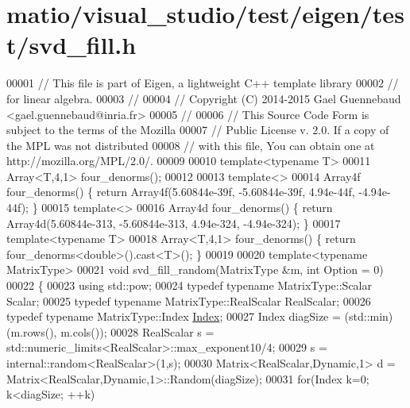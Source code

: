 \hypertarget{matio_2visual__studio_2test_2eigen_2test_2svd__fill_8h_source}{}\section{matio/visual\+\_\+studio/test/eigen/test/svd\+\_\+fill.h}
\label{matio_2visual__studio_2test_2eigen_2test_2svd__fill_8h_source}

\begin{DoxyCode}
00001 \textcolor{comment}{// This file is part of Eigen, a lightweight C++ template library}
00002 \textcolor{comment}{// for linear algebra.}
00003 \textcolor{comment}{//}
00004 \textcolor{comment}{// Copyright (C) 2014-2015 Gael Guennebaud <gael.guennebaud@inria.fr>}
00005 \textcolor{comment}{//}
00006 \textcolor{comment}{// This Source Code Form is subject to the terms of the Mozilla}
00007 \textcolor{comment}{// Public License v. 2.0. If a copy of the MPL was not distributed}
00008 \textcolor{comment}{// with this file, You can obtain one at http://mozilla.org/MPL/2.0/.}
00009 
00010 \textcolor{keyword}{template}<\textcolor{keyword}{typename} T>
00011 Array<T,4,1> four\_denorms();
00012 
00013 \textcolor{keyword}{template}<>
00014 Array4f four\_denorms() \{ \textcolor{keywordflow}{return} Array4f(5.60844e-39f, -5.60844e-39f, 4.94e-44f, -4.94e-44f); \}
00015 \textcolor{keyword}{template}<>
00016 Array4d four\_denorms() \{ \textcolor{keywordflow}{return} Array4d(5.60844e-313, -5.60844e-313, 4.94e-324, -4.94e-324); \}
00017 \textcolor{keyword}{template}<\textcolor{keyword}{typename} T>
00018 Array<T,4,1> four\_denorms() \{ \textcolor{keywordflow}{return} four\_denorms<double>().cast<T>(); \}
00019 
00020 \textcolor{keyword}{template}<\textcolor{keyword}{typename} MatrixType>
00021 \textcolor{keywordtype}{void} svd\_fill\_random(MatrixType &m, \textcolor{keywordtype}{int} Option = 0)
00022 \{
00023   \textcolor{keyword}{using} std::pow;
00024   \textcolor{keyword}{typedef} \textcolor{keyword}{typename} MatrixType::Scalar Scalar;
00025   \textcolor{keyword}{typedef} \textcolor{keyword}{typename} MatrixType::RealScalar RealScalar;
00026   \textcolor{keyword}{typedef} \textcolor{keyword}{typename} MatrixType::Index \hyperlink{namespace_eigen_a62e77e0933482dafde8fe197d9a2cfde}{Index};
00027   Index diagSize = (std::min)(m.rows(), m.cols());
00028   RealScalar s = std::numeric\_limits<RealScalar>::max\_exponent10/4;
00029   s = internal::random<RealScalar>(1,s);
00030   Matrix<RealScalar,Dynamic,1> d =  Matrix<RealScalar,Dynamic,1>::Random(diagSize);
00031   \textcolor{keywordflow}{for}(Index k=0; k<diagSize; ++k)

\end{DoxyCode}
